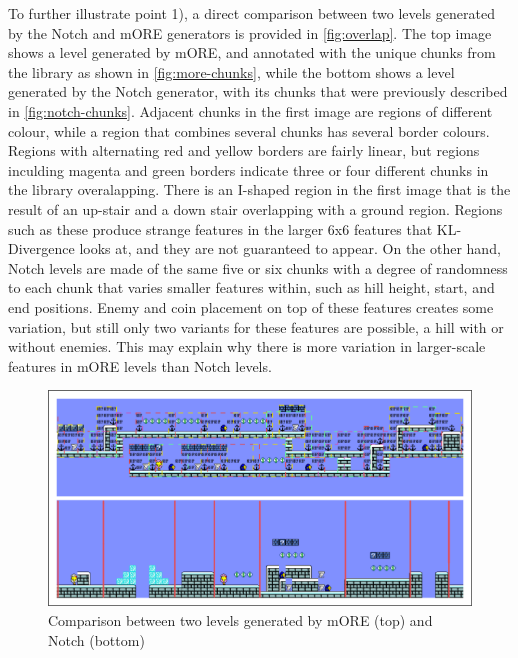 To further illustrate point 1), a direct comparison between two levels generated by the
Notch and mORE generators is provided in \autoref{fig:overlap}. The top image shows a level
generated by mORE, and annotated with the unique chunks from the library as shown in \autoref{fig:more-chunks},
while the bottom shows a level generated by the Notch generator, with its chunks that were
previously described in \autoref{fig:notch-chunks}. Adjacent chunks in the first image are
regions of different colour, while a region that combines several chunks has several border
colours. Regions with alternating red and yellow borders are fairly linear, but regions
inculding magenta and green borders indicate three or four different chunks in the library
overalapping. There is an I-shaped region in the first image that is the result of an up-stair
and a down stair overlapping with a ground region. Regions such as these produce strange
features in the larger 6x6 features that KL-Divergence looks at, and they are not
guaranteed to appear. On the other hand, Notch levels are made of the same five or six chunks
with a degree of randomness to each chunk that varies smaller features within, such as hill
height, start, and end positions. Enemy and coin placement on top of these features creates
some variation, but still only two variants for these features are possible, a hill with or
without enemies. This may explain why there is more variation in larger-scale features in
mORE levels than Notch levels.

\begin{figure}[h]
    \centering
    \includegraphics[width=\linewidth]{img/fig17-overlap.png}
    \caption{Comparison between two levels generated by mORE (top) and Notch (bottom)}
    \label{fig:overlap}
\end{figure}

